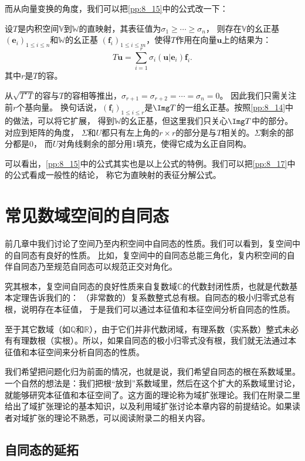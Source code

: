 \documentclass[12pt,UTF8]{ctexbook}
\begin{document}
而从向量变换的角度，我们可以把\ref{pp:8_15}中的公式改一下：
\begin{pp}\label{pp:8_17}
    设$T$是内积空间$\mathbb{V}$到$\mathbb{W}$的直映射，其表征值为$\sigma_1 \geqslant \cdots \geqslant \sigma_n$，
    则存在$\mathbb{V}$的幺正基$(\mathbf{e}_i)_{1\leqslant i \leqslant n}$和$\mathbb{W}$的幺正基
    $(\mathbf{f}_i)_{1\leqslant i \leqslant m}$，使得$T$作用在向量$\mathbf{u}$上的结果为：
    $$ T\mathbf{u} = \sum_{i=1}^r \sigma_i (\mathbf{u} | \mathbf{e}_i) \mathbf{f}_i.$$
    其中$r$是$T$的容。
\end{pp}
从$\sqrt{T^\star T}$的容与$T$的容相等推出，$\sigma_{r+1} = \sigma_{r+2} = \cdots = \sigma_{n} = 0$。
因此我们只需关注前$r$个基向量。
换句话说，$(\mathbf{f}_i)_{1\leqslant i \leqslant r}$是$\Img T$的一组幺正基。按照\ref{pp:8_14}中的做法，可以将它扩展，
得到$\mathbb{W}$的幺正基，但这里我们只关心$\Img T$中的部分。对应到矩阵的角度，
$\Sigma$和$U$都只有左上角的$r\times r$的部分是与$T$相关的。$\Sigma$剩余的部分都是$0$，
而$U$对角线剩余的部分用$1$填充，使得它成为幺正自同构。

可以看出，\ref{pp:8_15}中的公式其实也是以上公式的特例。我们可以把\ref{pp:8_17}中的公式看成一般性的结论，
称它为直映射的表征分解公式。

\chapter{常见数域空间的自同态}
前几章中我们讨论了空间乃至内积空间中自同态的性质。我们可以看到，复空间中的自同态有良好的性质。
比如，复空间中的自同态总能三角化，复内积空间的自伴自同态乃至规范自同态可以规范正交对角化。

究其根本，复空间自同态的良好性质来自复数域$\mathbb{C}$的代数封闭性质，也就是代数基本定理告诉我们的：
（非常数的）复系数整式总有根。自同态的极小归零式总有根，说明存在本征值，
于是我们可以通过本征值和本征空间分析自同态的性质。

至于其它数域（如$\mathbb{Q}$和$\mathbb{R}$），由于它们并非代数闭域，有理系数（实系数）整式未必有有理数根（实根）。所以，如果自同态的极小归零式没有根，我们就无法通过本征值和本征空间来分析自同态的性质。

我们希望把问题化归为前面的情况，也就是说，我们希望自同态的根在系数域里。一个自然的想法是：我们把根“放到”系数域里，然后在这个扩大的系数域里讨论，就能够研究本征值和本征空间了。这方面的理论称为域扩张理论。我们在附录二里给出了域扩张理论的基本知识，以及利用域扩张讨论本章内容的前提结论。如果读者对域扩张的理论不熟悉，可以阅读附录二的相关内容。

\section{自同态的延拓}
\end{document}
